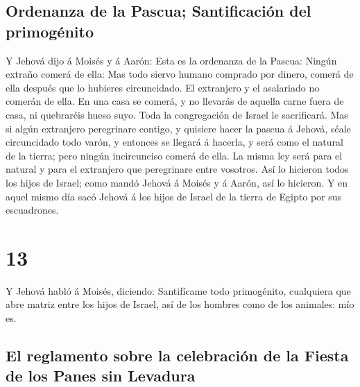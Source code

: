 \hypertarget{ordenanza-de-la-pascua-santificaciuxf3n-del-primoguxe9nito}{%
\subsection{Ordenanza de la Pascua; Santificación del
primogénito}\label{ordenanza-de-la-pascua-santificaciuxf3n-del-primoguxe9nito}}

 Y Jehová dijo á Moisés y á Aarón: Esta es la ordenanza
de la Pascua: Ningún extraño comerá de ella:  Mas todo
siervo humano comprado por dinero, comerá de ella después que lo
hubieres circuncidado.  El extranjero y el asalariado no
comerán de ella.  En una casa se comerá, y no llevarás de
aquella carne fuera de casa, ni quebraréis hueso suyo. 
Toda la congregación de Israel le sacrificará.  Mas si
algún extranjero peregrinare contigo, y quisiere hacer la pascua á
Jehová, séale circuncidado todo varón, y entonces se llegará á hacerla,
y será como el natural de la tierra; pero ningún incircunciso comerá de
ella.  La misma ley será para el natural y para el
extranjero que peregrinare entre vosotros.  Así lo
hicieron todos los hijos de Israel; como mandó Jehová á Moisés y á
Aarón, así lo hicieron.  Y en aquel mismo día sacó Jehová
á los hijos de Israel de la tierra de Egipto por sus escuadrones.

\hypertarget{section-02-13}{%
\section{13}\label{section-02-13}}

 Y Jehová habló á Moisés, diciendo: 
Santifícame todo primogénito, cualquiera que abre matriz entre los hijos
de Israel, así de los hombres como de los animales: mío es.

\hypertarget{el-reglamento-sobre-la-celebraciuxf3n-de-la-fiesta-de-los-panes-sin-levadura}{%
\subsection{El reglamento sobre la celebración de la Fiesta de los Panes
sin
Levadura}\label{el-reglamento-sobre-la-celebraciuxf3n-de-la-fiesta-de-los-panes-sin-levadura}}

